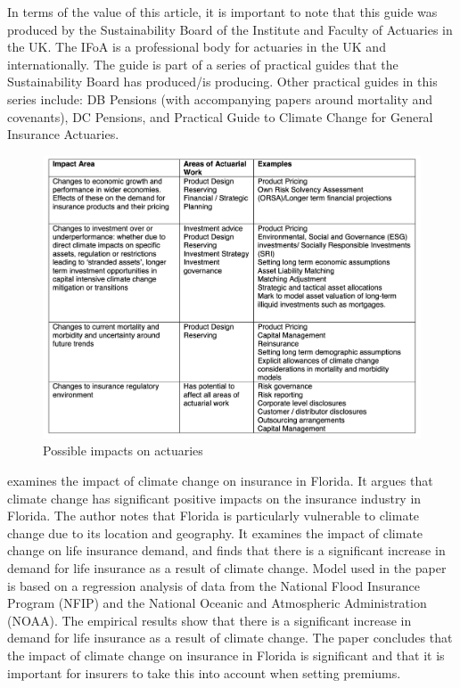 \documentclass[a4paper,12pt]{article}
\begin{document}
In terms of the value of this article, it is important to note that this guide was produced by the Sustainability Board of the Institute and Faculty of Actuaries in the UK. The IFoA is a professional body for actuaries in the UK and internationally. The guide is part of a series of practical guides that the Sustainability Board has produced/is producing. Other practical guides in this series include: DB Pensions (with accompanying papers around mortality and covenants), DC Pensions, and Practical Guide to Climate Change for General Insurance Actuaries.
\begin{figure}[H]
    \includegraphics[width=\linewidth]{img/actuarial.png}
    \caption{Possible impacts on actuaries}
\end{figure}

\cite{medders2017climate} examines the impact of climate change on insurance in Florida. It argues that climate change has significant positive impacts on the insurance industry in Florida. The author notes that Florida is particularly vulnerable to climate change due to its location and geography. It examines the impact of climate change on life insurance demand, and finds that there is a significant increase in demand for life insurance as a result of climate change. Model used in the paper is based on a regression analysis of data from the National Flood Insurance Program (NFIP) and the National Oceanic and Atmospheric Administration (NOAA). The empirical results show that there is a significant increase in demand for life insurance as a result of climate change. The paper concludes that the impact of climate change on insurance in Florida is significant and that it is important for insurers to take this into account when setting premiums.
\end{document}
